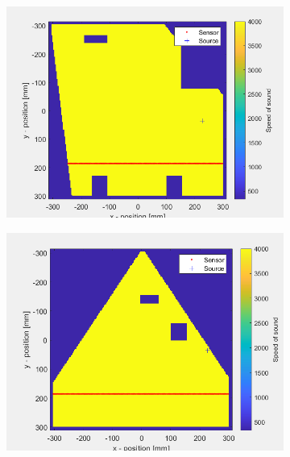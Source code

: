 \documentclass[conference]{IEEEtran}
\begin{document}
\begin{figure}[H]
  \begin{subfigure}{.155\textwidth}
    \centering
    \includegraphics[width=.95\linewidth]{forme1.png}
    \caption{}
    \label{fig:sfig1}
  \end{subfigure}%
  \begin{subfigure}{.155\textwidth}
    \centering
    \includegraphics[width=.95\linewidth]{forme2.png}
    \caption{}
    \label{fig:sfig2}
  \end{subfigure}
  \begin{subfigure}{.155\textwidth}
    \centering

\end{subfigure}
\end{figure}
\end{document}
